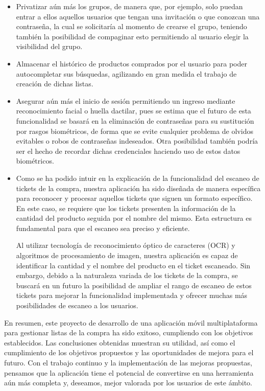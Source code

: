 \documentclass{article}
\begin{document}
\begin{itemize}
    \item Privatizar aún más los grupos, de manera que, por ejemplo, solo puedan entrar a ellos aquellos usuarios que tengan una invitación o que conozcan una contraseña, la cual se solicitaría al momento de crearse el grupo, teniendo también la posibilidad de compaginar esto permitiendo al usuario elegir la visibilidad del grupo.
    
    \item  Almacenar el histórico de productos comprados por el usuario para poder autocompletar sus búsquedas, agilizando en gran medida el trabajo de creación de dichas listas.
    
    \item Asegurar aún más el inicio de sesión permitiendo un ingreso mediante reconocimiento facial o huella dactilar, pues se estima \cite{ElPais} que el futuro de esta funcionalidad se basará en la eliminación de contraseñas para su sustitución por rasgos biométricos, de forma que se evite cualquier problema de olvidos evitables o robos de contraseñas indeseados. Otra posibilidad también podría ser el hecho de recordar dichas credenciales haciendo uso de estos datos biométricos.

    \item Como se ha podido intuir en la explicación de la funcionalidad del escaneo de tickets de la compra, nuestra aplicación ha sido diseñada de manera específica para reconocer y procesar aquellos tickets que siguen un formato específico. En este caso, se requiere que los tickets presenten la información de la cantidad del producto seguida por el nombre del mismo. Esta estructura es fundamental para que el escaneo sea preciso y eficiente.

    Al utilizar tecnología de reconocimiento óptico de caracteres (OCR) y algoritmos de procesamiento de imagen, nuestra aplicación es capaz de identificar la cantidad y el nombre del producto en el ticket escaneado. Sin embargo, debido a la naturaleza variada de los tickets de la compra, se buscará en un futuro la posibilidad de ampliar el rango de escaneo de estos tickets para mejorar la funcionalidad implementada y ofrecer muchas más posibilidades de escaneo a los usuarios.
\end{itemize}

En resumen, este proyecto de desarrollo de una aplicación móvil multiplataforma para gestionar listas de la compra ha sido exitoso, cumpliendo con los objetivos establecidos. Las conclusiones obtenidas muestran su utilidad, así como el cumplimiento de los objetivos propuestos y las oportunidades de mejora para el futuro. Con el trabajo continuo y la implementación de las mejoras propuestas, pensamos que la aplicación tiene el potencial de convertirse en una herramienta aún más completa y, deseamos, mejor valorada por los usuarios de este ámbito.
\end{document}
